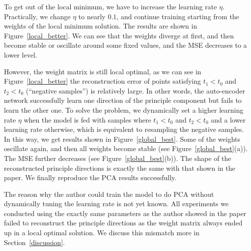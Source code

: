 To get out of the local minimum, we have to increase the learning rate $\eta$. 
Practically, we change $\eta$ to nearly $0.1$, and continue training starting from the weights of 
the local minimum solution. The results are shown in Figure~\ref{local_better}.
We can see that the weights diverge at first, and then become stable or oscillate around some fixed values,
and the MSE decreases to a lower level.

However, the weight matrix is still local optimal, 
as we can see in Figure~\ref{local_better} the reconstruction error of points
satisfying $t_1 < t_0$ and $t_2 < t_0$ (``negative samples'') is relatively large. 
In other words, the auto-encoder network successfully learn one direction of the principle component but fails
to learn the other one. To solve the problem, we dynamically set a higher learning rate $\eta$ when
the model is fed with samples where $t_1 < t_0$ and $t_2 < t_0$ and a lower learning rate otherwise,
which is equivalent to resampling the negative samples.
In this way, we get results shown in Figure~\ref{global_best}.
Some of the weights oscillate again, and then all weights become stable (see Figure~\ref{global_best}(a)).
The MSE further decreases (see Figure~\ref{global_best}(b)).
The shape of the reconstructed principle directions is exactly the same with that shown in the paper.
We finally reproduce the PCA results successfully.

The reason why the author could train the model to do PCA without dynamically tuning the learning rate is not yet known.
All experiments we conducted using the exactly same parameters as the author showed in the paper failed to reconstruct the principle directions as the weight matrix always ended up in a local optimal solution.
We discuss this mismatch more in Section~\ref{discussion}.

